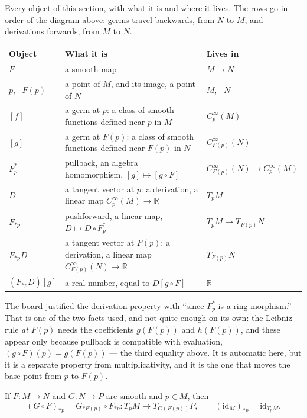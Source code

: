\documentclass[11pt]{report}
\makeatletter
\newcounter{thmcounter}[section]
\newcommand{\thmlabel}[1]{\edef\@currentlabel{\arabic{section}.\arabic{thmcounter}}\label{#1}}
\newcommand{\leeref}[1]{\par\smallskip{\raggedleft\footnotesize\textsc{Lee}:\ #1\par}}
\makeatother
\begin{document}
Every object of this section, with what it is and where it lives. The rows go in order of the diagram above: germs travel backwards, from $N$ to $M$, and derivations forwards, from $M$ to $N$.

\begin{center}
\renewcommand{\arraystretch}{1.25}
\begin{tabular}{>{\raggedright\arraybackslash}p{2.6cm} >{\raggedright\arraybackslash}p{7.8cm} >{\raggedright\arraybackslash}p{2.9cm}}
\toprule
\textbf{Object} & \textbf{What it is} & \textbf{Lives in} \\ \midrule
$F$ & a smooth map & $M \to N$ \\
$p$, \ $F(p)$ & a point of $M$, and its image, a point of $N$ & $M$, \ $N$ \\
$[f]$ & a germ at $p$: a class of smooth functions defined near $p$ in $M$ & $C^\infty_p(M)$ \\
$[g]$ & a germ at $F(p)$: a class of smooth functions defined near $F(p)$ in $N$ & $C^\infty_{F(p)}(N)$ \\
$F_p^*$ & pullback, an algebra homomorphism, $[g] \mapsto [g \circ F]$ & $C^\infty_{F(p)}(N) \to C^\infty_p(M)$ \\
$D$ & a tangent vector at $p$: a derivation, a linear map $C^\infty_p(M) \to \mathbb{R}$ & $T_pM$ \\
$F_{*p}$ & pushforward, a linear map, $D \mapsto D \circ F_p^*$ & $T_pM \to T_{F(p)}N$ \\
$F_{*p}D$ & a tangent vector at $F(p)$: a derivation, a linear map $C^\infty_{F(p)}(N) \to \mathbb{R}$ & $T_{F(p)}N$ \\
$(F_{*p}D)[g]$ & a real number, equal to $D[g \circ F]$ & $\mathbb{R}$ \\
\bottomrule
\end{tabular}
\end{center}

The board justified the derivation property with ``since $F_p^*$ is a ring morphism.'' That is one of the two facts used, and not quite enough on its own: the Leibniz rule \emph{at $F(p)$} needs the coefficients $g(F(p))$ and $h(F(p))$, and these appear only because pullback is compatible with evaluation, $(g \circ F)(p) = g(F(p))$ --- the third equality above. It is automatic here, but it is a separate property from multiplicativity, and it is the one that moves the base point from $p$ to $F(p)$.

\begin{thmbox}\thmlabel{prop:pushforward-functorial}
If $F : M \to N$ and $G : N \to P$ are smooth and $p \in M$, then
\[
(G \circ F)_{*p} = G_{*F(p)} \circ F_{*p} : T_pM \to T_{G(F(p))}P, \qquad (\mathrm{id}_M)_{*p} = \mathrm{id}_{T_pM} .
\]
\leeref{Proposition 3.6(b)}
\end{thmbox}
\end{document}
